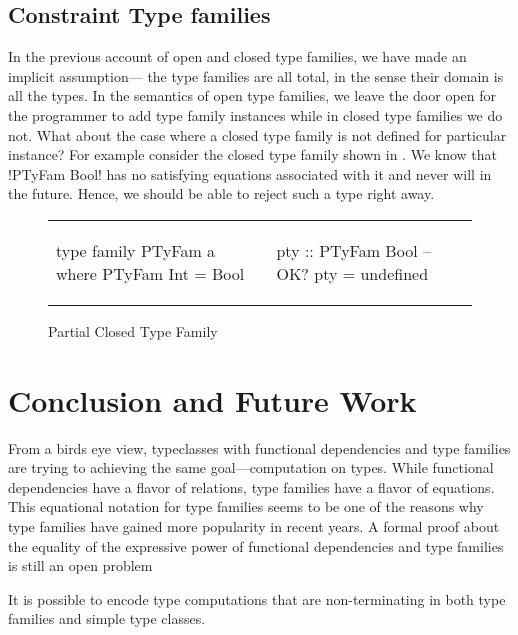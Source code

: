 \documentclass[format=sigplan,manuscript,review,screen, nonacm]{acmart}
\begin{document}
\subsection{Constraint Type families}
In the previous account of open and closed type families, we have made an implicit assumption---
the type families are all total, in the sense their domain is all the types.
In the semantics of open type families, we leave the door open for the programmer to
add type family instances while in closed type families we do not. What about the case
where a closed type family is not defined for particular instance? For example consider
the closed type family shown in . We know that !PTyFam Bool!
has no satisfying equations associated with it and never will in the future.
Hence, we should be able to reject such a type right away.

\begin{figure}[ht]
  \begin{tabular}{l l}
    \begin{code}
      type family PTyFam a where
          PTyFam Int = Bool
    \end{code}&%
    \begin{code}
      pty :: PTyFam Bool -- OK?
      pty = undefined
    \end{code}
  \end{tabular}
  \caption{Partial Closed Type Family}
  \label{fig:incomplete-tyfam}
\end{figure}

\section{Conclusion and Future Work}
From a birds eye view, typeclasses with functional dependencies and type families are trying to achieving the same
goal---computation on types. While functional dependencies have a flavor of relations, type families have a flavor of
equations. This equational notation for type families seems to be one of the reasons why type families have gained
more popularity in recent years. A formal proof about the equality of the expressive power of functional dependencies and
type families is still an open problem\cite{}

It is possible to encode type computations that are non-terminating in both type families and simple type classes.
\end{document}
